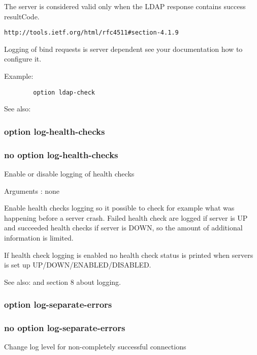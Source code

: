   The server is considered valid only when the LDAP response contains success resultCode.
  
  \verb|http://tools.ietf.org/html/rfc4511#section-4.1.9|

  Logging of bind requests is server dependent see your documentation how to
  configure it.

  Example:
\begin{verbatim}
        option ldap-check
\end{verbatim}

  See also: 


\subsubsection{option log-health-checks}
\subsubsection{no option log-health-checks}


  Enable or disable logging of health checks


  Arguments : none

  Enable health checks logging so it possible to check for example what
  was happening before a server crash. Failed health check are logged if
  server is UP and succeeded health checks if server is DOWN, so the amount
  of additional information is limited.

  If health check logging is enabled no health check status is printed
  when servers is set up UP/DOWN/ENABLED/DISABLED.

  See also:  and section 8 about logging.

\subsubsection{option log-separate-errors}
\subsubsection{no option log-separate-errors}


  Change log level for non-completely successful connections


